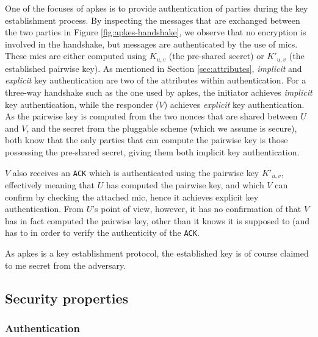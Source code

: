 One of the focuses of \gls{apkes} is to provide authentication of parties during the key establishment process. By inspecting the messages that are exchanged between the two parties in Figure \ref{fig:apkes-handshake}, we observe that no encryption is involved in the handshake, but messages are authenticated by the use of \gls{mic}s. These \gls{mic}s are either computed using $K_{u,v}$ (the pre-shared secret) or $K'_{u,v}$ (the established pairwise key). As mentioned in Section \ref{sec:attributes}, \emph{implicit} and \emph{explicit} key authentication are two of the attributes within authentication. For a three-way handshake such as the one used by \gls{apkes}, the initiator achieves \emph{implicit} key authentication, while the responder ($V$) achieves \emph{explicit} key authentication. As the pairwise key is computed from the two nonces that are shared between $U$ and $V$, and the secret from the pluggable scheme (which we assume is secure), both know that the only parties that can compute the pairwise key is those possessing the pre-shared secret, giving them both implicit key authentication. 

$V$ also receives an \texttt{ACK} which is authenticated using the pairwise key $K'_{u,v}$, effectively meaning that $U$ has computed the pairwise key, and which $V$ can confirm by checking the attached \gls{mic}, hence it achieves explicit key authentication. From $U$'s point of view, however, it has no confirmation of that $V$ has in fact computed the pairwise key, other than it knows it is supposed to (and has to in order to verify the authenticity of the \texttt{ACK}.

As \gls{apkes} is a key establishment protocol, the established key is of course claimed to me secret from the adversary.




\subsection{Security properties}

\subsubsection{Authentication}


